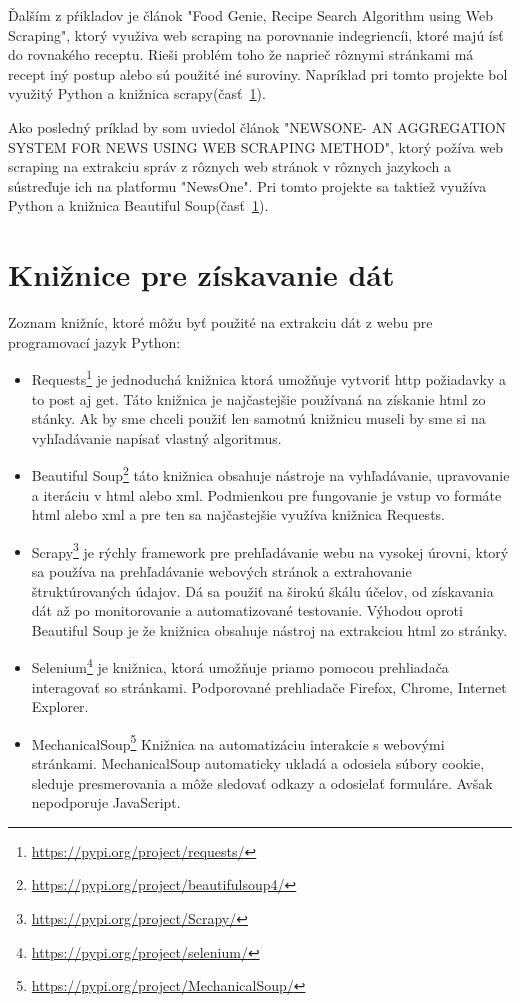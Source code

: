 \documentclass[10pt,twoside,slovak,a4paper]{article}
\begin{document}
Ďalším z pŕikladov je článok "Food Genie, Recipe Search Algorithm using Web Scraping"\cite{10270597}, ktorý využiva web scraping na porovnanie indegriencíi, ktoré majú ísť do rovnakého receptu. Rieši problém toho že naprieč rôznymi stránkami má recept iný postup alebo sú použité iné suroviny. Napríklad pri tomto projekte bol využitý Python a knižnica scrapy(časť~\ref{kniznice}).

Ako posledný príklad by som uviedol článok "NEWSONE- AN AGGREGATION SYSTEM FOR NEWS USING WEB SCRAPING METHOD"\cite{8067594}, ktorý požíva web scraping na extrakciu správ z rôznych web stránok v rôznych jazykoch a sústreďuje ich na platformu "NewsOne". Pri tomto projekte sa taktiež využíva Python a knižnica Beautiful Soup(časť~\ref{kniznice}).

\section{Knižnice pre získavanie dát} \label{kniznice}
Zoznam knižníc, ktoré môžu byť použité na extrakciu dát z webu pre programovací jazyk Python:
\begin{itemize}
\item Requests\footnote{\url{https://pypi.org/project/requests/}} je jednoduchá knižnica ktorá umožňuje vytvoriť http požiadavky a to post aj get. Táto knižnica je najčastejšie používaná na získanie html zo stánky. Ak by sme chceli použiť len samotnú knižnicu museli by sme si na vyhľadávanie napísať vlastný algoritmus.
\item Beautiful Soup\footnote{\url{https://pypi.org/project/beautifulsoup4/}} táto knižnica obsahuje nástroje na vyhľadávanie, upravovanie a iteráciu v html alebo xml. Podmienkou pre fungovanie je vstup vo formáte html alebo xml a pre ten sa najčastejšie využíva knižnica Requests.
\item Scrapy\footnote{\url{https://pypi.org/project/Scrapy/}} je rýchly framework pre prehľadávanie webu na vysokej úrovni, ktorý sa používa na prehľadávanie webových stránok a extrahovanie štruktúrovaných údajov. Dá sa použiť na širokú škálu účelov, od získavania dát až po monitorovanie a automatizované testovanie. Výhodou oproti Beautiful Soup je že knižnica obsahuje nástroj na extrakciou html zo stránky.
\item Selenium\footnote{\url{https://pypi.org/project/selenium/}} je knižnica, ktorá umožňuje priamo pomocou prehliadača interagovať so stránkami. Podporované prehliadače Firefox, Chrome, Internet Explorer. %
\item MechanicalSoup\footnote{\url{https://pypi.org/project/MechanicalSoup/}} Knižnica na automatizáciu interakcie s webovými stránkami. MechanicalSoup automaticky ukladá a odosiela súbory cookie, sleduje presmerovania a môže sledovať odkazy a odosielať formuláre. Avšak nepodporuje JavaScript.
\end{itemize}
\end{document}
